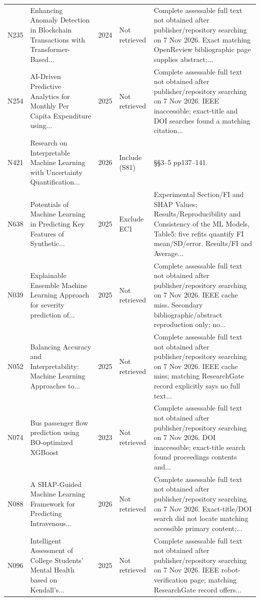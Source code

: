 \begin{longtable}{@{}P{1.0cm}P{6.3cm}P{0.7cm}P{1.6cm}P{6.1cm}@{}}
N235 & Enhancing Anomaly Detection in Blockchain Transactions with Transformer-Based... & 2024 & Not retrieved & Complete assessable full text not obtained after publisher/\allowbreak{}repository searching on 7 Nov 2026. Exact matching OpenReview bibliographic page supplies abstract;... \\
N254 & AI-Driven Predictive Analytics for Monthly Per Capita Expenditure using... & 2025 & Not retrieved & Complete assessable full text not obtained after publisher/\allowbreak{}repository searching on 7 Nov 2026. IEEE inaccessible; exact-title and DOI searches found a matching citation... \\
N421 & Research on Interpretable Machine Learning with Uncertainty Quantification... & 2026 & Include (S81) & §§3--5 pp137--141. \\
N638 & Potentials of Machine Learning in Predicting Key Features of Synthetic... & 2025 & Exclude EC1 & Experimental Section/\allowbreak{}FI and SHAP Values; Results/\allowbreak{}Reproducibility and Consistency of the ML Models, Table5: five refits quantify FI mean/\allowbreak{}SD/\allowbreak{}error. Results/\allowbreak{}FI and Average... \\
N039 & Explainable Ensemble Machine Learning Approach for severity prediction of... & 2025 & Not retrieved & Complete assessable full text not obtained after publisher/\allowbreak{}repository searching on 7 Nov 2026. IEEE cache miss. Secondary bibliographic/\allowbreak{}abstract reproduction only; no... \\
N052 & Balancing Accuracy and Interpretability: Machine Learning Approaches to... & 2025 & Not retrieved & Complete assessable full text not obtained after publisher/\allowbreak{}repository searching on 7 Nov 2026. IEEE cache miss; matching ResearchGate record explicitly says no full text... \\
N074 & Bus passenger flow prediction using BO-optimized XGBoost & 2023 & Not retrieved & Complete assessable full text not obtained after publisher/\allowbreak{}repository searching on 7 Nov 2026. DOI inaccessible; exact-title search found proceedings contents and... \\
N088 & A SHAP-Guided Machine Learning Framework for Predicting Intravenous... & 2026 & Not retrieved & Complete assessable full text not obtained after publisher/\allowbreak{}repository searching on 7 Nov 2026. Exact-title/\allowbreak{}DOI search did not locate matching accessible primary content;... \\
N096 & Intelligent Assessment of College Students' Mental Health based on Kendall's... & 2025 & Not retrieved & Complete assessable full text not obtained after publisher/\allowbreak{}repository searching on 7 Nov 2026. IEEE robot-verification page; matching ResearchGate record offers... \\

\end{longtable}
